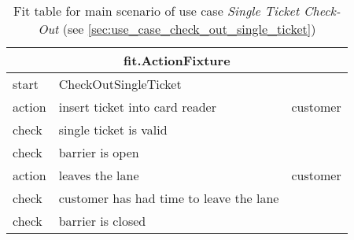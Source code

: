 
\begin{table}
\begin{centering}
\begin{tabular}{|l|l|l|}
\hline 
\multicolumn{3}{|c|}{fit.ActionFixture}\tabularnewline
\hline 
start & CheckOutSingleTicket & \tabularnewline
\hline 
action & insert ticket into card reader & customer \tabularnewline
\hline 
check & single ticket is valid & \tabularnewline
\hline 
check & barrier is open & \tabularnewline
\hline 
action & leaves the lane & customer \tabularnewline
\hline 
check & customer has had time to leave the lane & \tabularnewline
\hline 
check & barrier is closed & \tabularnewline
\hline 
\end{tabular}
\par\end{centering}

\caption{Fit table for main scenario of use case \emph{Single Ticket Check-Out} (see \autoref{sec:use_case_check_out_single_ticket})}
\end{table}
